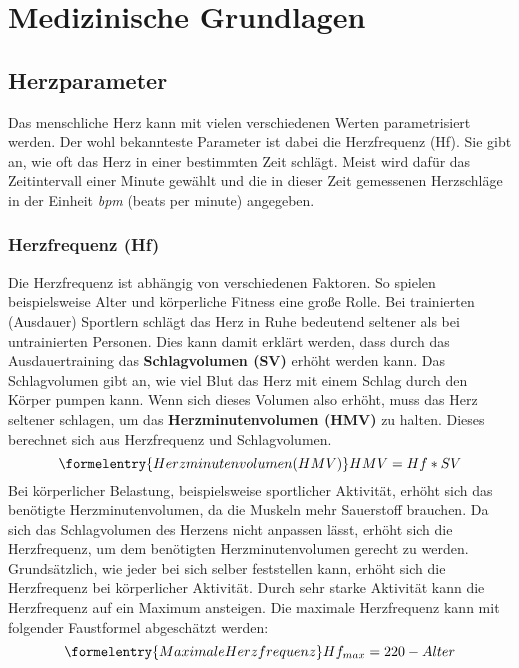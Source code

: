 
\chapter{Medizinische Grundlagen}

\section{Herzparameter}
Das menschliche Herz kann mit vielen verschiedenen Werten parametrisiert werden. Der wohl bekannteste Parameter ist dabei die Herzfrequenz (Hf). Sie gibt an, wie oft das Herz in einer bestimmten Zeit schlägt. Meist wird dafür das Zeitintervall einer Minute gewählt und die in dieser Zeit gemessenen Herzschläge in der Einheit \emph{bpm} (beats per minute) angegeben. 
\subsection{Herzfrequenz (Hf)} \label {subsec:hf}
Die Herzfrequenz ist abhängig von verschiedenen Faktoren. So spielen beispielsweise Alter und körperliche Fitness eine große Rolle. Bei trainierten (Ausdauer) Sportlern schlägt das Herz in Ruhe bedeutend seltener als bei untrainierten Personen. Dies kann damit erklärt werden, dass durch das Ausdauertraining das \textbf{Schlagvolumen (SV)} erhöht werden kann. Das Schlagvolumen gibt an, wie viel Blut das Herz mit einem Schlag durch den Körper pumpen kann. Wenn sich dieses Volumen also erhöht, muss das Herz seltener schlagen, um das \textbf{Herzminutenvolumen (HMV)} zu halten. Dieses berechnet sich aus Herzfrequenz und Schlagvolumen. \cite{herz} 
\begin{equation}\formelentry{Herzminutenvolumen (HMV)}
	HMV = Hf * SV
\end{equation} 
Bei körperlicher Belastung, beispielsweise sportlicher Aktivität, erhöht sich das benötigte Herzminutenvolumen, da die Muskeln mehr Sauerstoff brauchen. Da sich das Schlagvolumen des Herzens nicht anpassen lässt, erhöht sich die Herzfrequenz, um dem benötigten Herzminutenvolumen gerecht zu werden. Grundsätzlich, wie jeder bei sich selber feststellen kann, erhöht sich die Herzfrequenz bei körperlicher Aktivität. Durch sehr starke Aktivität kann die Herzfrequenz auf ein Maximum ansteigen. Die maximale Herzfrequenz kann mit folgender Faustformel abgeschätzt werden: 
\begin{equation}\formelentry{Maximale Herzfrequenz}
	Hf_{max} = 220 - Alter
\end{equation}
